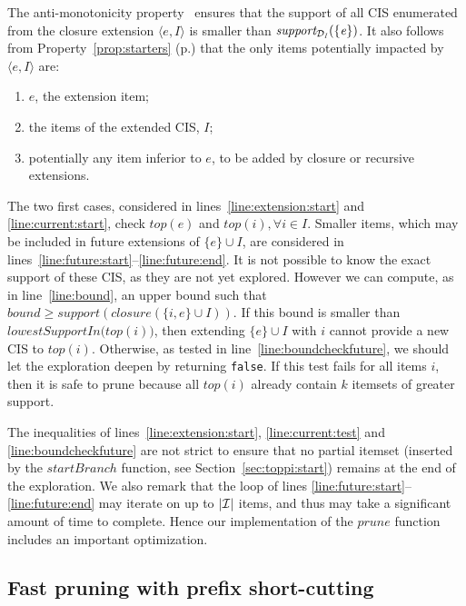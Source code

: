 The anti-monotonicity property~\cite{AgrawalVLDB94} ensures that
the support of all CIS enumerated from the closure extension $\langle e, I\rangle$
is smaller than $\mathit{support_{{\cal D}_I}(\{e\})}$.
It also follows from Property~\ref{prop:starters} (p.\pageref{prop:starters}) that the only items
potentially impacted by $\langle e, I\rangle$ are:

\begin{enumerate}
  \item \label{toppi:cq:e} $e$, the extension item;
  \item \label{toppi:cq:P} the items of the extended CIS, $I$;
  \item \label{toppi:cq:others} potentially any item inferior to $e$, to be added by closure or recursive extensions.
\end{enumerate}

The two first cases, considered in lines~\ref{line:extension:start} and \ref{line:current:start},
check $\mathit{top(e)}$ and $\mathit{top(i)}, \forall i \in I$.
Smaller items, which may be included in future extensions of $\{e\}\cup I$,
are considered in lines~\ref{line:future:start}--\ref{line:future:end}.
It is not possible to know the exact support of these CIS, as they are not yet explored.
However we can compute, as in line~\ref{line:bound},
an upper bound such that $\mathit{bound} \geq \mathit{support}(\mathit{closure}(\{i, e\}\cup I))$.
If this bound is smaller than $\mathit{lowestSupportIn(top}(i))$,
then extending $\{e\}\cup I$ with $i$ cannot provide a new CIS to $\mathit{top}(i)$.
Otherwise, as tested in line~\ref{line:boundcheckfuture},
we should let the exploration deepen by returning \verb|false|.
If this test fails for all items $i$,
then it is safe to prune because all $\mathit{top}(i)$ already contain $k$ itemsets of greater support.

The inequalities of lines~\ref{line:extension:start}, \ref{line:current:test} and \ref{line:boundcheckfuture}
are not strict to ensure that no partial itemset
(inserted by the $\mathit{startBranch}$ function, see Section~\ref{sec:toppi:start})
remains at the end of the exploration.
We also remark that the loop of lines \ref{line:future:start}--\ref{line:future:end}
may iterate on up to $|{\cal I}|$ items, and thus may take a significant amount of time to complete.
Hence our implementation of the $\mathit{prune}$ function includes an important optimization.

\subsection{Fast pruning with prefix short-cutting}
\label{sec:toppi:shortcut}

